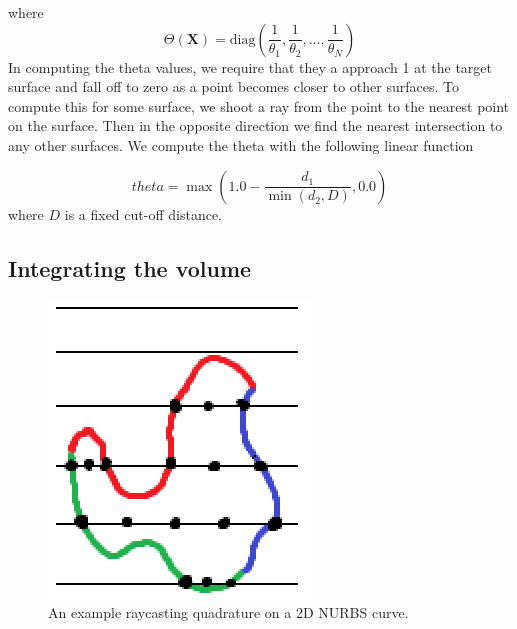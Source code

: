 \documentclass[sigconf]{acmart}
\begin{document}
where
\begin{equation}
     \Theta(\mathbf{X}) = \text{diag}\left( \frac{1}{\theta_1},\frac{1}{\theta_2},\dots,\frac{1}{\theta_N}\right)
\end{equation}
In computing the theta values, we require that they a approach 1 at the target surface and fall off to zero as a point becomes closer to other surfaces. To compute this for some surface, we shoot a ray from the point to the nearest point on the surface.  Then in the opposite direction we find the nearest intersection to any other surfaces. We compute the theta with the following linear function 

\begin{equation}
theta = \max (1.0 - \frac{d_1}{\min (d_2, D)}, 0.0)
\end{equation}
where $D$ is a fixed cut-off distance.


\subsection{Integrating the volume}
\begin{figure}[h]
  \centering
  \includegraphics[width=\linewidth]{figures/raycasting_quadrature}
  \caption{An example raycasting quadrature on a 2D NURBS curve.}
\end{figure}
\end{document}
